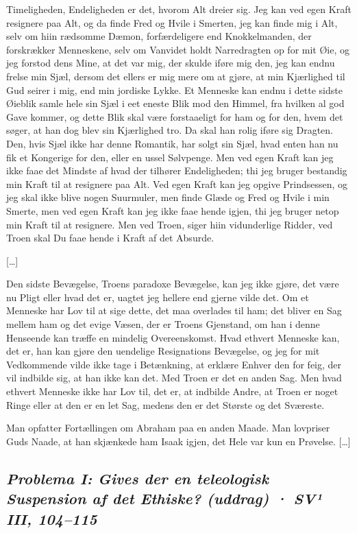 \documentclass[12pt,a4paper]{article}
\newcommand{\sectionheading}[1]{\subsection*{\normalfont\itshape #1}}
\begin{document}
Timeligheden, Endeligheden er det, hvorom Alt dreier sig. Jeg kan ved egen Kraft resignere paa Alt, og da finde Fred og Hvile i Smerten, jeg kan finde mig i Alt, selv om hiin rædsomme Dæmon, forfærdeligere end Knokkelmanden, der forskrækker Menneskene, selv om Vanvidet holdt Narredragten op for mit Øie, og jeg forstod dens Mine, at det var mig, der skulde iføre mig den, jeg kan endnu frelse min Sjæl, dersom det ellers er mig mere om at gjøre, at min Kjærlighed til Gud seirer i mig, end min jordiske Lykke. Et Menneske kan endnu i dette sidste Øieblik samle hele sin Sjæl i eet eneste Blik mod den Himmel, fra hvilken al god Gave kommer, og dette Blik skal være forstaaeligt for ham og for den, hvem det søger, at han dog blev sin Kjærlighed tro. Da skal han rolig iføre sig Dragten. Den, hvis Sjæl ikke har denne Romantik, har solgt sin Sjæl, hvad enten han nu fik et Kongerige for den, eller en ussel Sølvpenge. Men ved egen Kraft kan jeg ikke faae det Mindste af hvad der tilhører Endeligheden; thi jeg bruger bestandig min Kraft til at resignere paa Alt. Ved egen Kraft kan jeg opgive Prindsessen, og jeg skal ikke blive nogen Suurmuler, men finde Glæde og Fred og Hvile i min Smerte, men ved egen Kraft kan jeg ikke faae hende igjen, thi jeg bruger netop min Kraft til at resignere. Men ved Troen, siger hiin vidunderlige Ridder, ved Troen skal Du faae hende i Kraft af det Absurde.

[…]

Den sidste Bevægelse, Troens paradoxe Bevægelse, kan jeg ikke gjøre, det være nu Pligt eller hvad det er, uagtet jeg hellere end gjerne vilde det. Om et Menneske har Lov til at sige dette, det maa overlades til ham; det bliver en Sag mellem ham og det evige Væsen, der er Troens Gjenstand, om han i denne Henseende kan træffe en mindelig Overeenskomst. Hvad ethvert Menneske kan, det er, han kan gjøre den uendelige Resignations Bevægelse, og jeg for mit Vedkommende vilde ikke tage i Betænkning, at erklære Enhver den for feig, der vil indbilde sig, at han ikke kan det. Med Troen er det en anden Sag. Men hvad ethvert Menneske ikke har Lov til, det er, at indbilde Andre, at Troen er noget Ringe eller at den er en let Sag, medens den er det Største og det Sværeste.

Man opfatter Fortællingen om Abraham paa en anden Maade. Man lovpriser Guds Naade, at han skjænkede ham Isaak igjen, det Hele var kun en Prøvelse. […]

\sectionheading{Problema I: Gives der en teleologisk Suspension af det Ethiske? (uddrag)  ·  SV¹ III, 104–115}
\end{document}

